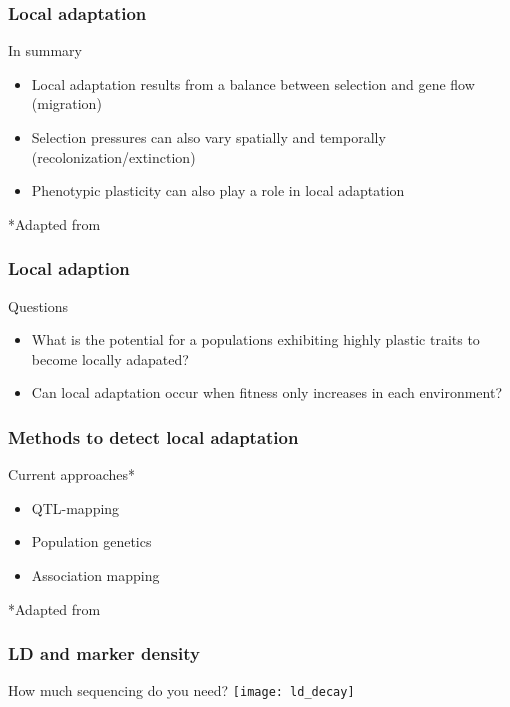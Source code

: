 \begin{frame}
\frametitle{Local adaptation}
\begin{block}{In summary}
\begin{itemize}
\item{Local adaptation results from a balance between selection and gene flow
(migration)}
\item{Selection pressures can also vary spatially and temporally
(recolonization/extinction)}
\item{Phenotypic plasticity can also play a role in local adaptation}
\end{itemize}
\end{block}
\tiny
*Adapted from \citet{Savolainen:2013dfa}
\end{frame}

\begin{frame}
\frametitle{Local adaption}
\begin{block}{Questions}

\begin{itemize}
\item{What is the potential for a populations exhibiting highly plastic traits
to become locally adapated?}
\item{Can local adaptation occur when fitness only increases in each
environment?}
\end{itemize}
\end{block}
\end{frame}



\begin{frame}
\frametitle{Methods to detect local adaptation}
\begin{block}{Current approaches*}{}
\begin{itemize}
\item{QTL-mapping}
\item{Population genetics}
\item{Association mapping}
\end{itemize}
\end{block}
\tiny
*Adapted from \citet{Savolainen:2013dfa}
\end{frame}

\begin{frame}
\frametitle{LD and marker density}
\begin{block}{How much sequencing do you need?}
\centering
\texttt{[image: ld\_decay]}
\end{block}
\end{frame}


